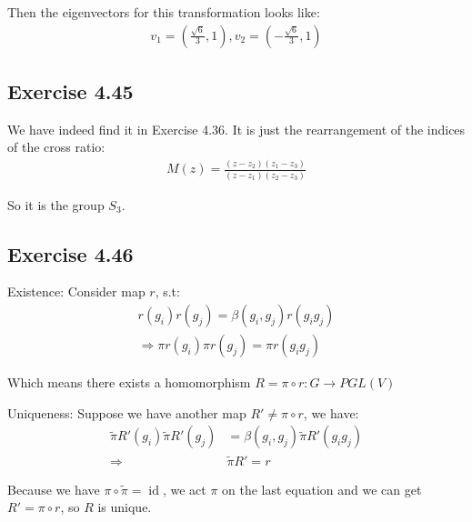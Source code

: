 \documentclass[]{ctexart}
\begin{document}
			Then the eigenvectors for this transformation looks like:
				\begin{equation*}
				\begin{aligned}
					v_1=(\frac{\sqrt{6}}{3},1),v_2=(-\frac{\sqrt{6}}{3},1)
				\end{aligned}
				\end{equation*}
			
	\subsection{Exercise 4.45}
		We have indeed find it in Exercise 4.36. It is just the rearrangement of the indices of the cross ratio:
			\begin{equation*}
			\begin{aligned}
				M(z)=\frac{(z-z_2)(z_1-z_3)}{(z-z_1)(z_2-z_3)}
			\end{aligned}
			\end{equation*}
		
		So it is the group $S_3$. 
	
	\subsection{Exercise 4.46}
		Existence: Consider map $r$, s.t:
			\begin{equation*}
			\begin{aligned}
				r(g_i)r(g_j)=\beta(g_i,g_j)r(g_ig_j)\\
				\Rightarrow \pi r(g_i)\pi r(g_j)=\pi r(g_ig_j)
			\end{aligned}
			\end{equation*}
		
		Which means there exists a homomorphism $R=\pi \circ r:G\rightarrow PGL(V)$
		
		Uniqueness: Suppose we have another map $R'\neq \pi \circ r$, we have:
			\begin{equation*}
			\begin{aligned}
				\tilde{\pi} R'(g_i) \tilde{\pi} R'(g_j)&=\beta(g_i,g_j)\tilde{\pi}R'(g_ig_j)\\
				\Rightarrow &\tilde{\pi} R'=r
			\end{aligned}
			\end{equation*}
		
		Because we have $\pi \circ \tilde{\pi}=\operatorname{id}$, we act $\pi $ on the last equation and we can get $R'=\pi \circ r$, so $R$ is unique. 
	
\end{document}
